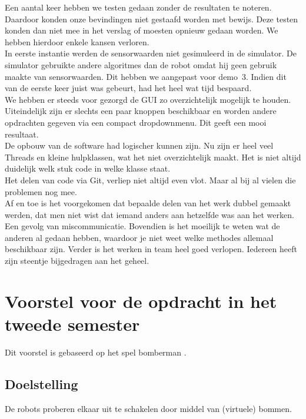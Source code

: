 \documentclass[t1]{penoverslag}
\begin{document}
Een aantal keer hebben we testen gedaan zonder de resultaten te noteren. Daardoor konden onze bevindingen niet gestaafd worden met bewijs. Deze testen konden dan niet mee in het verslag of moesten opnieuw gedaan worden. We hebben hierdoor enkele kansen verloren.\\

In eerste instantie werden de sensorwaarden niet gesimuleerd in de simulator. De simulator gebruikte andere algoritmes dan de robot omdat hij geen gebruik maakte van sensorwaarden. Dit hebben we aangepast voor demo~3. Indien dit van de eerste keer juist was gebeurt, had het heel wat tijd bespaard.\\

We hebben er steeds voor gezorgd de GUI zo overzichtelijk mogelijk te houden. Uiteindelijk zijn er slechts een paar knoppen beschikbaar en worden andere opdrachten gegeven via een compact dropdownmenu. Dit geeft een mooi resultaat.\\

De opbouw van de software had logischer kunnen zijn. Nu zijn er heel veel Threads en kleine hulpklassen, wat het niet overzichtelijk maakt. Het is niet altijd duidelijk welk stuk code in welke klasse staat.\\

Het delen van code via Git, verliep niet altijd even vlot. Maar al bij al vielen die problemen nog mee.\\

Af en toe is het voorgekomen dat bepaalde delen van het werk dubbel gemaakt werden, dat men niet wist dat iemand anders aan hetzelfde was aan het werken. Een gevolg van miscommunicatie. Bovendien is het moeilijk te weten wat de anderen al gedaan hebben, waardoor je niet weet welke methodes allemaal beschikbaar zijn. Verder is het werken in team heel goed verlopen. Iedereen heeft zijn steentje bijgedragen aan het geheel.

\section{Voorstel voor de opdracht in het tweede semester}
\label{Assec:voorstelOpdracht}
Dit voorstel is gebaseerd op het spel bomberman \cite{bomberman}.

\subsection{Doelstelling}
De robots proberen elkaar uit te schakelen door middel van (virtuele) bommen.
\end{document}

